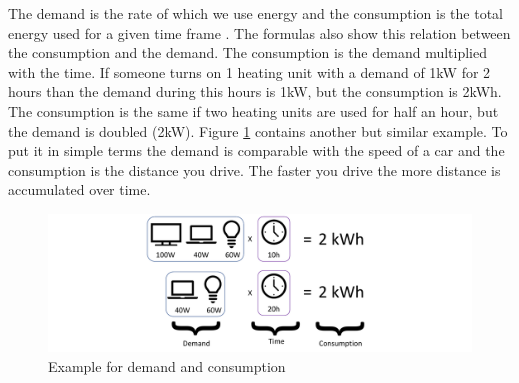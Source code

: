 The demand is the rate of which we use energy and the consumption is the total energy used for a given time frame \cite{StonyBrookUniversity}. The formulas also show this relation between the consumption and the demand. The consumption is the demand multiplied with the time. If someone turns on 1 heating unit with a demand of 1kW for 2 hours than the demand during this hours is 1kW, but the consumption is 2kWh. The consumption is the same if two heating units are used for half an hour, but the demand is doubled (2kW). Figure \ref{fig:demandConsumption} contains another but similar example. To put it in simple terms the demand is comparable with the speed of a car and the consumption is the distance you drive. The faster you drive the more distance is accumulated over time.
\begin{figure}[!h]
	\centering
	\includegraphics[width=1.00\textwidth]{../figures/DemandConsumption.pdf}
	\caption{Example for demand and consumption}
	\label{fig:demandConsumption}
\end{figure}